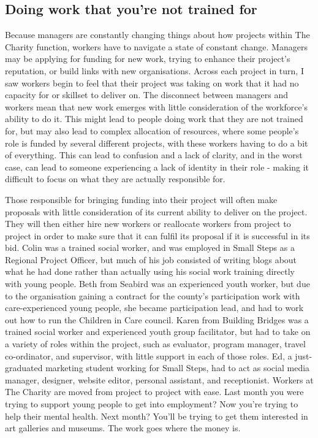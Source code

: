 \subsection{Doing work that you’re not trained for}
Because managers are constantly changing things about how projects within The Charity function, workers have to navigate a state of constant change. Managers may be applying for funding for new work, trying to enhance their project’s reputation, or build links with new organisations. Across each project in turn, I saw workers begin to feel that their project was taking on work that it had no capacity for or skillset to deliver on. The disconnect between managers and workers mean that new work emerges with little consideration of the workforce's ability to do it. This might lead to people doing work that they are not trained for, but may also lead to complex allocation of resources, where some people’s role is funded by several different projects, with these workers having to do a bit of everything. This can lead to confusion and a lack of clarity, and in the worst case, can lead to someone experiencing a lack of identity in their role - making it difficult to focus on what they are actually responsible for.

Those responsible for bringing funding into their project will often make proposals with little consideration of its current ability to deliver on the project. They will then either hire new workers or reallocate workers from project to project in order to make sure that it can fulfil its proposal if it is successful in its bid. Colin was a trained social worker, and was employed in Small Steps as a Regional Project Officer, but much of his job consisted of writing blogs about what he had done rather than actually using his social work training directly with young people. Beth from Seabird was an experienced youth worker, but due to the organisation gaining a contract for the county’s participation work with care-experienced young people, she became participation lead, and had to work out how to run the Children in Care council. Karen from Building Bridges was a trained social worker and experienced youth group facilitator, but had to take on a variety of roles within the project, such as evaluator, program manager, travel co-ordinator, and supervisor, with little support in each of those roles. Ed, a just-graduated marketing student working for Small Steps, had to act as social media manager, designer, website editor, personal assistant, and receptionist. Workers at The Charity are moved from project to project with ease. Last month you were trying to support young people to get into employment? Now you're trying to help their mental health. Next month? You'll be trying to get them interested in art galleries and museums. The work goes where the money is.

